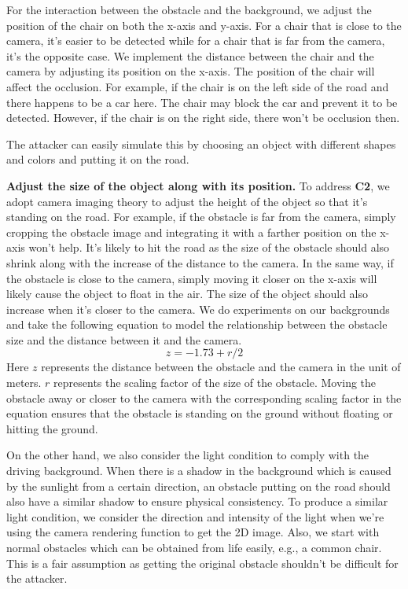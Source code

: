 For the interaction between the obstacle and the background, we adjust the position of the chair on both the x-axis and y-axis.
For a chair that is close to the camera, it's easier to be detected while for a chair that is far from the camera, it's the opposite case.
We implement the distance between the chair and the camera by adjusting its position on the x-axis.
The position of the chair will affect the occlusion. 
For example, if the chair is on the left side of the road and there happens to be a car here. 
The chair may block the car and prevent it to be detected.
However, if the chair is on the right side, there won't be occlusion then.

The attacker can easily simulate this by choosing an object with different shapes and colors and putting it on the road.

\textbf{Adjust the size of the object along with its position.}
To address \textbf{C2}, we adopt camera imaging theory to adjust the height of the object so that it's standing on the road.
For example, if the obstacle is far from the camera, simply cropping the obstacle image and integrating it with a farther position on the x-axis won't help.
It's likely to hit the road as the size of the obstacle should also shrink along with the increase of the distance to the camera.
In the same way, if the obstacle is close to the camera, simply moving it closer on the x-axis will likely cause the object to float in the air.
The size of the object should also increase when it's closer to the camera.
We do experiments on our backgrounds and take the following equation to model the relationship between the obstacle size and the distance between it and the camera.
\begin{equation}
	z = -1.73 + r/2
\end{equation}
Here \(z\) represents the distance between the obstacle and the camera in the unit of meters. \(r\) represents the scaling factor of the size of the obstacle.
Moving the obstacle away or closer to the camera with the corresponding scaling factor in the equation ensures 
that the obstacle is standing on the ground without floating or hitting the ground.

On the other hand, we also consider the light condition to comply with the driving background.
When there is a shadow in the background which is caused by the sunlight from a certain direction, 
an obstacle putting on the road should also have a similar shadow to ensure physical consistency.
To produce a similar light condition, 
we consider the direction and intensity of the light when we're using the camera rendering function to get the 2D image.
Also, we start with normal obstacles which can be obtained from
life easily, e.g., a common chair.
This is a fair assumption as getting the original obstacle shouldn't be difficult for the attacker.

